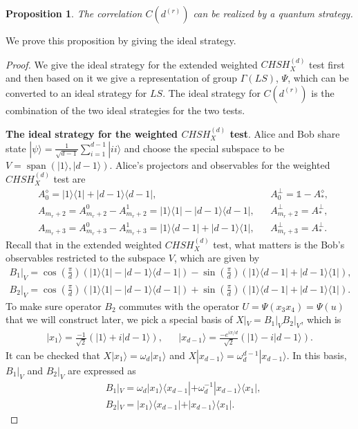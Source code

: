 \documentclass[11pt,letterpaper]{article}
\newcommand{\ket}[1]{|#1\rangle}
\newcommand{\ketbra}[2]{|#1\rangle\langle#2|}
\DeclareMathOperator{\spn}{span}
\newcommand{\1}{\mathbb{1}}
\newcommand{\CHSH}{CHSH^{(d)}}
\newcommand{\LS}{LS}
\newcommand{\dr}[1]{d^{(#1)}}
\newtheorem{proposition}[theorem]{Proposition}
\theoremstyle{definition}
\begin{document}
\begin{proposition}
	\label{prop:realize}
	The correlation $C(\dr{r})$ can be realized by a quantum strategy.
\end{proposition}
We prove this proposition by giving the ideal strategy.
\begin{proof}
We give the ideal strategy for the extended weighted $\CHSH_X$ test first and then based on it we give a representation of 
group $\Gamma(\LS)$, $\Psi$, which can be converted to an ideal strategy for $\LS$. 
The ideal strategy for $C(\dr{r})$ is the combination of the two ideal strategies for the two tests.

\textbf{The ideal strategy for the weighted $\CHSH_X$ test}.
Alice and Bob share state $\ket{\psi} = \frac{1}{\sqrt{d-1}}\sum_{i=1}^{d-1} \ket{ii}$ and choose the special subspace to be 
$V = \spn(\ket{1} ,\ket{d-1})$.
Alice's projectors and observables for the weighted $\CHSH_X$ test are
\begin{align*}
	&A_0^\diamond = \ketbra{1}{1} + \ketbra{d-1}{d-1}, &&A_0^\perp = \1 - A_\ast^\diamond, \\
	&A_{m_r+2} = A_{m_r+2}^0-A_{m_r+2}^1 = \ketbra{1}{1} - \ketbra{d-1}{d-1}, &&A_{m_r+2}^\perp = A_\ast^\perp,\\
	&A_{m_r+3} = A_{m_r+3}^0-A_{m_r+3}^1 = \ketbra{1}{d-1} + \ketbra{d-1}{1} ,&&A_{m_r+3}^\perp = A_\ast^\perp.
\end{align*}
Recall that in the extended weighted $\CHSH_X$ test, what matters is the 
Bob's observables restricted to the subspace $V$, which are given by
\begin{align*}
	B_1|_V = \cos(\frac{\pi}{d})(\ketbra{1}{1} - \ketbra{d-1}{d-1}) - \sin(\frac{\pi}{d})(\ketbra{1}{d-1} + \ketbra{d-1}{1}),\\
	B_2|_V = \cos(\frac{\pi}{d})(\ketbra{1}{1} - \ketbra{d-1}{d-1}) +\sin(\frac{\pi}{d})(\ketbra{1}{d-1} + \ketbra{d-1}{1}).
\end{align*}
To make sure operator $B_2$ commutes with the operator $U = \Psi(x_3x_4) = \Psi(u)$ that we will construct later, we pick a 
special basis of $X|_V =B_1|_VB_2|_V$, which is
\begin{align}
	\ket{x_1} = \frac{-1}{\sqrt{2}}(\ket{1} + i\ket{d-1}), &&
	\ket{x_{d-1}} = \frac{-e^{i\pi/d}}{\sqrt{2}}(\ket{1} - i\ket{d-1}).
\end{align}
It can be checked that $X\ket{x_1} = \omega_d \ket{x_1}$ and $X\ket{x_{d-1}} = \omega_d^{d-1} \ket{x_{d-1}}$.
In this basis, $B_1|_V$ and $B_2|_V$ are expressed as 
\begin{align}
	&B_1|_V = \omega_d\ketbra{x_1}{x_{d-1}} + \omega_d^{-1} \ketbra{x_{d-1}}{x_1},\\
	&B_2|_V =\ketbra{x_1}{x_{d-1}}  + \ketbra{x_{d-1}}{x_1}.
\end{align}


\end{proof}
\end{document}
